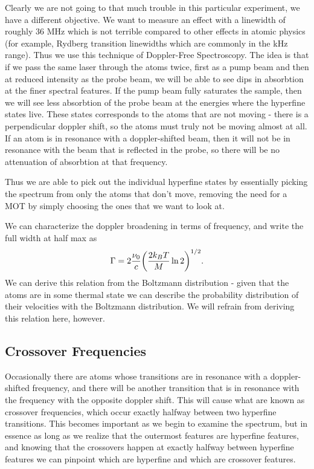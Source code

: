 \documentclass{article}
\DeclarePairedDelimiter{\parens}{\lparen}{\rparen}
\begin{document}
  Clearly we are not going to that much trouble in this particular experiment, we have a different objective.  We want to measure an effect with a linewidth of roughly 36 MHz which is not terrible compared to other effects in atomic physics (for example, Rydberg transition linewidths which are commonly in the kHz range).  Thus we use this technique of Doppler-Free Spectroscopy.  The idea is that if we pass the same laser through the atoms twice, first as a pump beam and then at reduced intensity as the probe beam, we will be able to see dips in absorbtion at the finer spectral features.  If the pump beam fully saturates the sample, then we will see less absorbtion of the probe beam at the energies where the hyperfine states live.  These states corresponds to the atoms that are not moving - there is a perpendicular doppler shift, so the atoms must truly not be moving almost at all.  If an atom is in resonance with a doppler-shifted beam, then it will not be in resonance with the beam that is reflected in the probe, so there will be no attenuation of absorbtion at that frequency.

  \hspace{.25cm}

  Thus we are able to pick out the individual hyperfine states by essentially picking the spectrum from only the atoms that don't move, removing the need for a MOT by simply choosing the ones that we want to look at.

  \hspace{.25cm}

  We can characterize the doppler broadening in terms of frequency, and write the full width at half max as
  \begin{equation*}
    \Gamma = 2\frac{\nu_0}{c}\parens*{\frac{2k_BT}{M}\ln{2}}^{1/2}.
  \end{equation*}
  We can derive this relation from the Boltzmann distribution - given that the atoms are in some thermal state we can describe the probability distribution of their velocities with the Boltzmann distribution.  We will refrain from deriving this relation here, however.

  \subsection{Crossover Frequencies}
  Occasionally there are atoms whose transitions are in resonance with a doppler-shifted frequency, and there will be another transition that is in resonance with the frequency with the opposite doppler shift.  This will cause what are known as crossover frequencies, which occur exactly halfway between two hyperfine transitions.  This becomes important as we begin to examine the spectrum, but in essence as long as we realize that the outermost features are hyperfine features, and knowing that the crossovers happen at exactly halfway between hyperfine features we can pinpoint which are hyperfine and which are crossover features.
\end{document}
